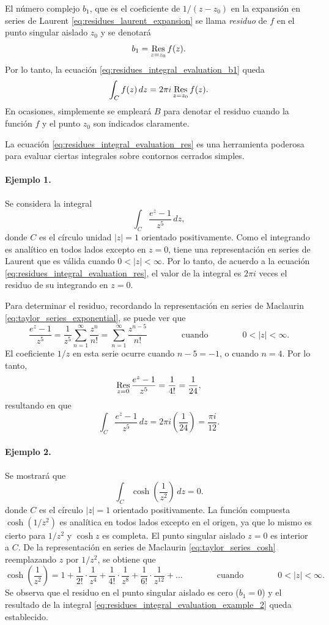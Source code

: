 \documentclass[a4paper]{report}
\def\Res{\qopname\relax m{Res}}
\begin{document}
El número complejo \(b_1\), que es el coeficiente de \(1/(z-z_0)\) en la expansión en series de Laurent \ref{eq:residues_laurent_expansion} se llama \emph{residuo} de \(f\) en el punto singular aislado \(z_0\) y se denotará
\[
 b_1=\Res_{z=z_0}f(z).
\]
Por lo tanto, la ecuación \ref{eq:residues_integral_evaluation_b1} queda
\begin{equation}\label{eq:residues_integral_evaluation_res}
 \int_C f(z)\,dz=2\pi i\Res_{z=z_0}f(z).
\end{equation}
En ocasiones, simplemente se empleará \(B\) para denotar el residuo cuando la función \(f\) y el punto \(z_0\) son indicados claramente.

La ecuación \ref{eq:residues_integral_evaluation_res} es una herramienta poderosa para evaluar ciertas integrales sobre contornos cerrados simples.

\paragraph{Ejemplo 1.} Se considera la integral
\[
 \int_C\frac{e^z-1}{z^5}\,dz,
\]
donde \(C\) es el círculo unidad \(|z|=1\) orientado positivamente. Como el integrando es analítico en todos lados excepto en \(z=0\), tiene una representación en series de Laurent que es válida cuando \(0<|z|<\infty\). Por lo tanto, de acuerdo a la ecuación \ref{eq:residues_integral_evaluation_res}, el valor de la integral es \(2\pi i\) veces el residuo de su integrando en \(z=0\). 

Para determinar el residuo, recordando la representación en series de Maclaurin \ref{eq:taylor_series_exponential}, se puede ver que 
\[
 \frac{e^z-1}{z^5}=\frac{1}{z^5}\sum_{n=1}^\infty\frac{z^n}{n!}=\sum_{n=1}^\infty\frac{z^{n-5}}{n!}
 \qquad\qquad\textrm{cuando}\qquad\qquad
 0<|z|<\infty.
\]
El coeficiente \(1/z\) en esta serie ocurre cuando \(n-5=-1\), o cuando \(n=4\). Por lo tanto,
\[
 \Res_{z=0}\frac{e^z-1}{z^5}=\frac{1}{4!}=\frac{1}{24},
\]
resultando en que 
\[
 \int_C\frac{e^z-1}{z^5}\,dz=2\pi i\left(\frac{1}{24}\right)=\frac{\pi i}{12}. 
\]

\paragraph{Ejemplo 2.} Se mostrará que 
\begin{equation}\label{eq:residues_integral_evaluation_example_2}
 \int_C\cosh\left(\frac{1}{z^2}\right)\,dz=0. 
\end{equation}
donde \(C\) es el círculo \(|z|=1\) orientado positivamente. La función compuesta \(\cosh(1/z^2)\) es analítica en todos lados excepto en el origen, ya que lo mismo es cierto para \(1/z^2\) y \(\cosh z\) es completa. El punto singular aislado \(z=0\) es interior a \(C\). De la representación en series de Maclaurin \ref{eq:taylor_series_cosh} reemplazando \(z\) por \(1/z^2\), se obtiene que 
\[
 \cosh\left(\frac{1}{z^2}\right)=1+\frac{1}{2!}\cdot\frac{1}{z^4}+\frac{1}{4!}\cdot\frac{1}{z^8}+\frac{1}{6!}\cdot\frac{1}{z^{12}}+\dots
 \qquad\qquad\textrm{cuando}\qquad\qquad
 0<|z|<\infty.
\]
Se observa que el residuo en el punto singular aislado es cero (\(b_1=0\)) y el resultado de la integral \ref{eq:residues_integral_evaluation_example_2} queda establecido.
\end{document}
